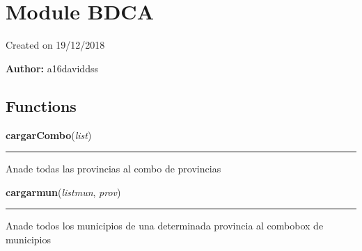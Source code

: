 %
%
%


\section{Module BDCA}

    \label{BDCA}
Created on 19/12/2018

\textbf{Author:} a16daviddss





  \subsection{Functions}

    \label{BDCA:cargarCombo}

    \vspace{0.5ex}

\hspace{.8\funcindent}\begin{boxedminipage}{\funcwidth}

    \raggedright \textbf{cargarCombo}(\textit{list})

    \vspace{-1.5ex}

    \rule{\textwidth}{0.5\fboxrule}
\setlength{\parskip}{2ex}
    Anade todas las provincias al combo de provincias

\setlength{\parskip}{1ex}
    \end{boxedminipage}

    \label{BDCA:cargarmun}

    \vspace{0.5ex}

\hspace{.8\funcindent}\begin{boxedminipage}{\funcwidth}

    \raggedright \textbf{cargarmun}(\textit{listmun}, \textit{prov})

    \vspace{-1.5ex}

    \rule{\textwidth}{0.5\fboxrule}
\setlength{\parskip}{2ex}
    Anade todos los municipios de una determinada provincia al combobox de 
    municipios

\setlength{\parskip}{1ex}
    \end{boxedminipage}

